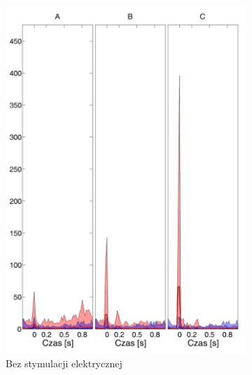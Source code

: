 \documentclass{pracamgr_2}
\begin{document}
	\begin{figure}[h]
		\begin{subfigure}{.5\textwidth}
			\centering
			\includegraphics[width=1.\linewidth]{kontrola15_20-40_z_SC6_do_CxC102.png}
			\caption{Bez stymulacji elektrycznej}
			\label{rys:20_40_kon_SC_CxC}
		\end{subfigure}%
		\begin{subfigure}{.5\textwidth}
			\centering

\end{subfigure}
\end{figure}
\end{document}
